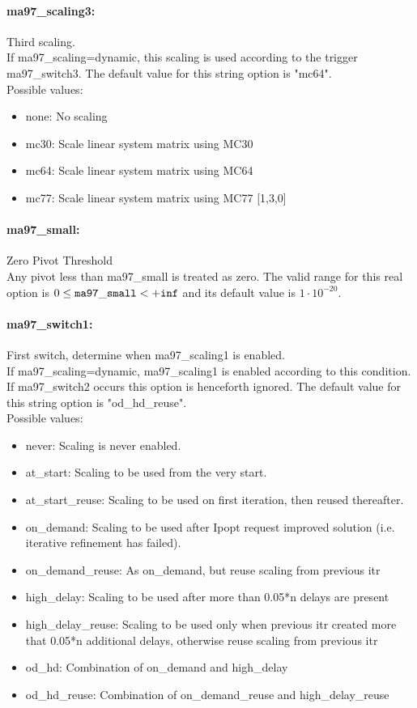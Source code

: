 \paragraph{ma97\_scaling3:}\label{opt:ma97_scaling3} Third scaling. \\
 If ma97\_scaling=dynamic, this scaling is used
according to the trigger ma97\_switch3. The default value for this string option is "mc64".
\\ 
Possible values:
\begin{itemize}
   \item none: No scaling
   \item mc30: Scale linear system matrix using MC30
   \item mc64: Scale linear system matrix using MC64
   \item mc77: Scale linear system matrix using MC77 [1,3,0]
\end{itemize}

\paragraph{ma97\_small:}\label{opt:ma97_small} Zero Pivot Threshold \\
 Any pivot less than ma97\_small is treated as
zero. The valid range for this real option is 
$0 \le {\tt ma97\_small } <  {\tt +inf}$
and its default value is $1 \cdot 10^{-20}$.


\paragraph{ma97\_switch1:}\label{opt:ma97_switch1} First switch, determine when ma97\_scaling1 is enabled. \\
 If ma97\_scaling=dynamic, ma97\_scaling1 is
enabled according to this condition. If
ma97\_switch2 occurs this option is henceforth
ignored. The default value for this string option is "od\_hd\_reuse".
\\ 
Possible values:
\begin{itemize}
   \item never: Scaling is never enabled.
   \item at\_start: Scaling to be used from the very start.
   \item at\_start\_reuse: Scaling to be used on first iteration, then
reused thereafter.
   \item on\_demand: Scaling to be used after Ipopt request improved
solution (i.e. iterative refinement has failed).
   \item on\_demand\_reuse: As on\_demand, but reuse scaling from previous
itr
   \item high\_delay: Scaling to be used after more than 0.05*n
delays are present
   \item high\_delay\_reuse: Scaling to be used only when previous itr
created more that 0.05*n additional delays,
otherwise reuse scaling from previous itr
   \item od\_hd: Combination of on\_demand and high\_delay
   \item od\_hd\_reuse: Combination of on\_demand\_reuse and
high\_delay\_reuse
\end{itemize}

